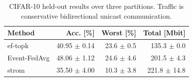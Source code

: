 \begin{table}[t]
\centering
\small
\caption{CIFAR-10 held-out results over three partitions. Traffic is conservative bidirectional unicast communication.}
\label{tab:cifar10-p3}
\begin{tabular}{lrrr}
\toprule
Method & Acc. [\%] & Worst [\%] & Total [Mbit]\\
\midrule
ef-topk & 40.95 $\pm$ 0.14 & 23.6 $\pm$ 0.5 & 135.3 $\pm$ 0.0\\
Event-FedAvg & 48.06 $\pm$ 1.12 & 24.6 $\pm$ 4.6 & 201.5 $\pm$ 4.3\\
strom & 35.50 $\pm$ 4.00 & 10.3 $\pm$ 3.8 & 221.8 $\pm$ 14.8\\
\bottomrule
\end{tabular}
\end{table}
